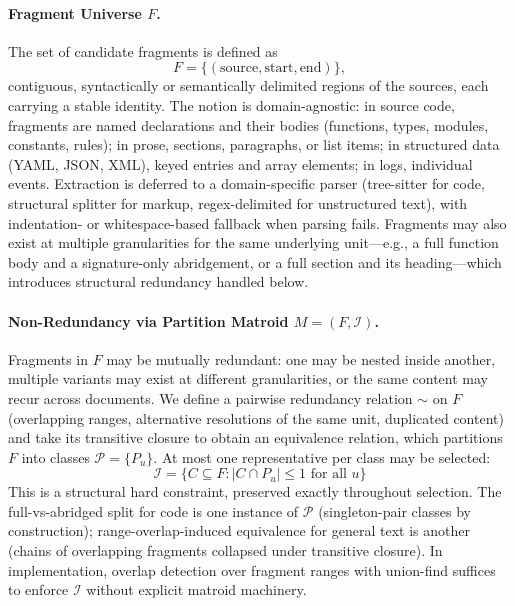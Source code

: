 \documentclass[11pt, a4paper]{article}
\begin{document}
\paragraph{Fragment Universe $F$.} The set of candidate fragments is defined as
\begin{equation}
F = \{(\mathrm{source}, \mathrm{start}, \mathrm{end})\},
\end{equation}
contiguous, syntactically or semantically delimited regions of the sources, each carrying a stable identity. The notion is domain-agnostic: in source code, fragments are named declarations and their bodies (functions, types, modules, constants, rules); in prose, sections, paragraphs, or list items; in structured data (YAML, JSON, XML), keyed entries and array elements; in logs, individual events. Extraction is deferred to a domain-specific parser (tree-sitter for code, structural splitter for markup, regex-delimited for unstructured text), with indentation- or whitespace-based fallback when parsing fails. Fragments may also exist at multiple granularities for the same underlying unit---e.g., a full function body and a signature-only abridgement, or a full section and its heading---which introduces structural redundancy handled below.

\paragraph{Non-Redundancy via Partition Matroid $M = (F, \mathcal{I})$.} Fragments in $F$ may be mutually redundant: one may be nested inside another, multiple variants may exist at different granularities, or the same content may recur across documents. We define a pairwise redundancy relation $\sim$ on $F$ (overlapping ranges, alternative resolutions of the same unit, duplicated content) and take its transitive closure to obtain an equivalence relation, which partitions $F$ into classes $\mathcal{P} = \{P_u\}$. At most one representative per class may be selected:
\begin{equation}
\mathcal{I} = \{C \subseteq F : |C \cap P_u| \leq 1 \text{ for all } u\}
\end{equation}
This is a structural hard constraint, preserved exactly throughout selection. The full-vs-abridged split for code is one instance of $\mathcal{P}$ (singleton-pair classes by construction); range-overlap-induced equivalence for general text is another (chains of overlapping fragments collapsed under transitive closure). In implementation, overlap detection over fragment ranges with union-find suffices to enforce $\mathcal{I}$ without explicit matroid machinery.
\end{document}
